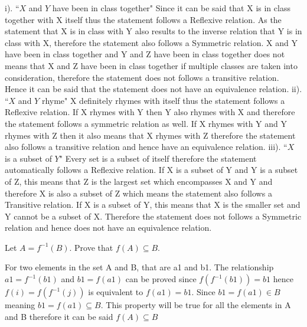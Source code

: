 \documentclass[addpoints]{exam}
\begin{document}
\begin{questions}
\begin{parts}
  \begin{solution}
    \newline
    i). ``$X$ and $Y$ have been in class together"
    \newline
    Since it can be said that X is in class together with X itself thus the statement follows a Reflexive relation. As the statement that X is in class with Y also results to the inverse relation that Y is in class with X, therefore the statement also follows a Symmetric relation. X and Y have been in class together and Y and Z have been in class together does not means that X and Z have been in class together if multiple classes are taken into consideration, therefore the statement does not follows a transitive relation. Hence it can be said that the statement does not have an equivalence relation.
    \newline
    \newline
    ii). ``$X$ and $Y$ rhyme"
    \newline
    X definitely rhymes with itself thus the statement follows a Reflexive relation.
    If X rhymes with Y then Y also rhymes with X and therefore the statement follows a symmetric relation as well. If X rhymes with Y and Y rhymes with Z then it also means that X rhymes with Z therefore the statement also follows a transitive relation and hence have an equivalence relation.
    \newline
    \newline
    iii). ``$X$ is a subset of $Y$"
    \newline
    Every set is a subset of itself therefore the statement automatically follows a Reflexive relation. If X is a subset of Y and Y is a subset of Z, this means that Z is the largest set which encompasses X and Y and therefore X is also a subset of Z which means the statement also follows a Transitive relation. If X is a subset of Y, this means that X is the smaller set and Y cannot be a subset of X. Therefore the statement does not follows a Symmetric relation and hence does not have an equivalence relation. 
    \newline
    
  \end{solution}

\end{parts}

\question[15] Let $A = f^{-1}(B)$. Prove that $f(A) \subseteq B$.
  \begin{solution}
    \newline
    For two elements in the set A and B, that are a1 and b1. The relationship $a1=f^{-1}(b1)$ and $b1= f(a1)$ can be proved since $f(f^{-1}(b1))=b1$ hence $f(i)=f(f^{-1}(j))$ is equivalent to $f(a1)=b1$. Since $b1=f(a1) \in B$ meaning $b1=f(a1)\subseteq B$. This property will be true for all the elements in A and B therefore it can be said $f(A)\subseteq B$ 
  \end{solution}


\end{questions}
\end{document}
